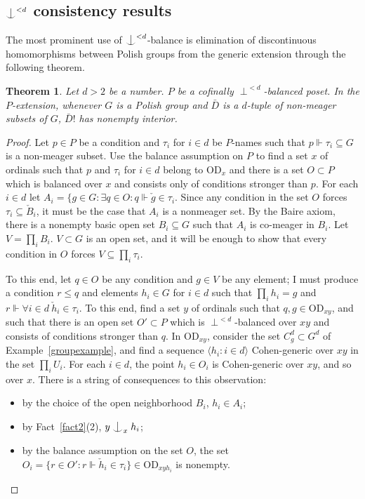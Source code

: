 \documentclass{article}
\newcommand{\vd}{\mathrm{OD}}
\newcommand{\forkindep}[1][]{%
  \mathrel{
    \mathop{
      \vcenter{
        \hbox{\oalign{\noalign{\kern-.3ex}\hfil$\vert$\hfil\cr
              \noalign{\kern-.7ex}
              $\smile$\cr\noalign{\kern-.3ex}}}
      }
    }\displaylimits_{#1}
  }
}
\newtheorem{theorem}{Theorem}[section]
\theoremstyle{definition}
\begin{document}
\subsection{$\forkindep^{<d}$ consistency results}

The most prominent use of $\forkindep^{<d}$-balance is elimination of discontinuous homomorphisms between Polish groups from the generic extension through the following theorem.

\begin{theorem}
\label{grouptheorem}
Let $d>2$ be a number. $P$ be a cofinally $\perp^{<d}$-balanced poset. In the $P$-extension, whenever $G$ is a Polish group and $\bar D$ is a $d$-tuple of non-meager subsets of $G$, $\bar D!$ has nonempty interior.
\end{theorem}

\begin{proof}
Let $p\in P$ be a condition and $\tau_i$ for $i\in d$ be $P$-names such that $p\Vdash\tau_i\subseteq G$ is a non-meager subset. Use the balance assumption on $P$ to find a set $x$ of ordinals such that $p$ and $\tau_i$ for $i\in d$ belong to $\vd_x$ and there is a set $O\subset P$ which is balanced over $x$ and consists only of conditions stronger than $p$. For each $i\in d$ let $A_i=\{g\in G\colon\exists q\in O\colon q\Vdash\check g\in\tau_i$. Since any condition in the set $O$ forces $\tau_i\subseteq \check B_i$, it must be the case that $A_i$ is a nonmeager set. By the Baire axiom, there is a nonempty basic open set $B_i\subseteq G$ such that $A_i$ is co-meager in $B_i$. Let $V=\prod_iB_i$. $V\subset G$ is an open set, and it will be enough to show that every condition in $O$ forces $V\subseteq\prod_i\tau_i$.

To this end, let $q\in O$ be any condition and $g\in V$ be any element; I must produce a condition $r\leq q$ and elements $h_i\in G$ for $i\in d$ such that $\prod_ih_i=g$ and $r\Vdash\forall i\in d\ \check h_i\in\tau_i$. To this end, find a set $y$ of ordinals such that $q, g\in\vd_{xy}$, and such that there is an open set $O'\subset P$ which is $\perp^{<d}$-balanced over $xy$ and consists of conditions stronger than $q$. In $\vd_{xy}$, consider the set $C^d_g\subset G^d$ of Example~\ref{groupexample}, and find a sequence $\langle h_i\colon i\in d\rangle$ Cohen-generic over ${xy}$ in the set $\prod_iU_i$. For each $i\in d$, the point $h_i\in O_i$ is Cohen-generic over ${xy}$, and so over $x$. There is a string of consequences to this observation:

\begin{itemize}
\item by the choice of the open neighborhood $B_i$, $h_i\in A_i$;
\item by Fact~\ref{fact2}(2), $y\forkindep_xh_i$;
\item by the balance assumption on the set $O$, the set $O_i=\{r\in O'\colon r\Vdash\check h_i\in\tau_i\}\in\vd_{xyh_i}$ is nonempty.
\end{itemize}


\end{proof}
\end{document}
